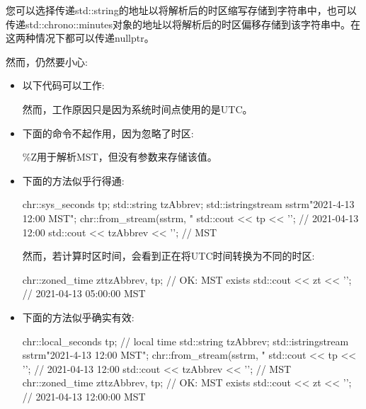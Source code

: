 您可以选择传递std::string的地址以将解析后的时区缩写存储到字符串中，也可以传递std::chrono::minutes对象的地址以将解析后的时区偏移存储到该字符串中。在这两种情况下都可以传递nullptr。

然而，仍然要小心:

\begin{itemize}
\item 
以下代码可以工作:


然而，工作原因只是因为系统时间点使用的是UTC。

\item
下面的命令不起作用，因为忽略了时区:


\%Z用于解析MST，但没有参数来存储该值。

\item
下面的方法似乎行得通:

\begin{cpp}
chr::sys_seconds tp;
std::string tzAbbrev;
std::istringstream sstrm{"2021-4-13 12:00 MST"};
chr::from_stream(sstrm, "%
std::cout << tp << '\n'; // 2021-04-13 12:00
std::cout << tzAbbrev << '\n'; // MST
\end{cpp}

然而，若计算时区时间，会看到正在将UTC时间转换为不同的时区:

\begin{cpp}
chr::zoned_time zt{tzAbbrev, tp}; // OK: MST exists
std::cout << zt << '\n'; // 2021-04-13 05:00:00 MST
\end{cpp}

\item
下面的方法似乎确实有效:

\begin{cpp}
chr::local_seconds tp; // local time
std::string tzAbbrev;
std::istringstream sstrm{"2021-4-13 12:00 MST"};
chr::from_stream(sstrm, "%
std::cout << tp << '\n'; // 2021-04-13 12:00
std::cout << tzAbbrev << '\n'; // MST
chr::zoned_time zt{tzAbbrev, tp}; // OK: MST exists
std::cout << zt << '\n'; // 2021-04-13 12:00:00 MST
\end{cpp}


\end{itemize}
